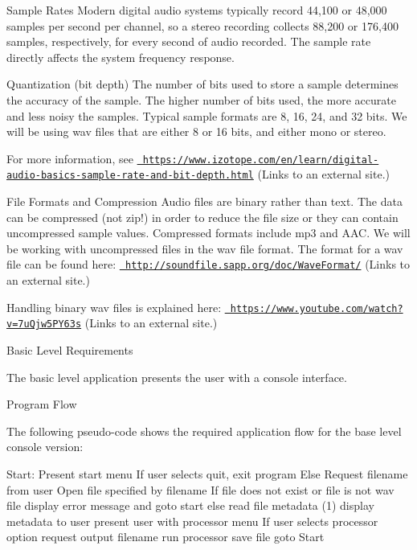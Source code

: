 Sample Rates Modern digital audio systems typically record 44,100 or 48,000 samples per second per channel, so a stereo recording collects 88,200 or 176,400 samples, respectively, for every second of audio recorded. The sample rate directly affects the system frequency response.

Quantization (bit depth) The number of bits used to store a sample determines the accuracy of the sample. The higher number of bits used, the more accurate and less noisy the samples. Typical sample formats are 8, 16, 24, and 32 bits. We will be using wav files that are either 8 or 16 bits, and either mono or stereo.

For more information, see \href{https://www.izotope.com/en/learn/digital-audio-basics-sample-rate-and-bit-depth.html}{\texttt{ https\+://www.\+izotope.\+com/en/learn/digital-\/audio-\/basics-\/sample-\/rate-\/and-\/bit-\/depth.\+html}} (Links to an external site.)

File Formats and Compression Audio files are binary rather than text. The data can be compressed (not zip!) in order to reduce the file size or they can contain uncompressed sample values. Compressed formats include mp3 and A\+AC. We will be working with uncompressed files in the wav file format. The format for a wav file can be found here\+: \href{http://soundfile.sapp.org/doc/WaveFormat/}{\texttt{ http\+://soundfile.\+sapp.\+org/doc/\+Wave\+Format/}} (Links to an external site.)

Handling binary wav files is explained here\+: \href{https://www.youtube.com/watch?v=7uQjw5PY63s}{\texttt{ https\+://www.\+youtube.\+com/watch?v=7u\+Qjw5\+P\+Y63s}} (Links to an external site.)

Basic Level Requirements
\begin{DoxyItemize}
\item The basic level application presents the user with a console interface.
\end{DoxyItemize}

Program Flow
\begin{DoxyItemize}
\item The following pseudo-\/code shows the required application flow for the base level console version\+:
\end{DoxyItemize}

Start\+: Present start menu If user selects quit, exit program Else Request filename from user Open file specified by filename If file does not exist or file is not wav file display error message and goto start else read file metadata (1) display metadata to user present user with processor menu If user selects processor option request output filename run processor save file goto Start


